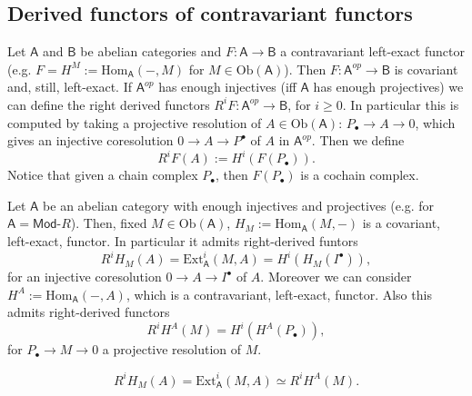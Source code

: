 \subsection{Derived functors of contravariant functors}
\begin{rem}
	Let $\mathsf{A}$ and $\mathsf{B}$ be abelian categories and $F: \mathsf{A} \to \mathsf{B}$
	a contravariant left-exact functor (e.g. $F = H^M := \mathrm{Hom}_{\mathsf{A}} \left( -, M \right)$
	for $M \in \mathrm{Ob} \left(\mathsf{A}\right)$).
	Then $F: \mathsf{A}^{op} \to \mathsf{B}$ is covariant and, still, left-exact.
	If $\mathsf{A}^{op}$ has enough injectives (iff $\mathsf{A}$ has enough projectives)
	we can define the right derived functors $R^iF: \mathsf{A}^{op} \to \mathsf{B}$, for $i \geq 0$.
	In particular this is computed by taking a projective resolution of $A \in \mathrm{Ob} \left(\mathsf{A}\right)$:
	$P_{\bullet} \to A \to 0$, which gives an injective coresolution
	$0 \to A \to P^\bullet$ of $A$ in $\mathsf{A}^{op}$.
	Then we define
	\begin{equation}
		R^iF(A) := H^i(F(P_\bullet))
	.\end{equation} 
	Notice that given a chain complex $P_{\bullet}$, then $F(P_{\bullet})$ is a 
	cochain complex.
\end{rem}

\begin{rem}[]
	Let $\mathsf{A}$ be an abelian category with enough injectives and projectives (e.g. for
	$\mathsf{A} = \mathsf{Mod}\text{-}R$).
	Then, fixed $M \in \mathrm{Ob} \left(\mathsf{A}\right)$, $H_M := \mathrm{Hom}_{\mathsf{A}} \left( M, - \right)$
	is a covariant, left-exact, functor.
	In particular it admits right-derived funtors
	\begin{equation}
		R^iH_M(A) = \mathrm{Ext}^i_{\mathsf{A}} \left( M, A \right) =
		H^i \left( H_M (I^\bullet) \right)
	,\end{equation} 
	for an injective coresolution $0 \to A \to I^\bullet$ of $A$.
	Moreover we can consider $H^A := \mathrm{Hom}_{\mathsf{A}} \left( -, A \right)$, which
	is a contravariant, left-exact, functor.
	Also this admits right-derived functors
	\begin{equation}
		R^iH^A(M) = H^i \left( H^A(P_{\bullet}) \right)
	,\end{equation} 
	for $P_{\bullet} \to M \to 0$ a projective resolution of $M$.
\end{rem}

\begin{thm}
	\begin{equation}
		R^i H_M(A) = \mathrm{Ext}^i_{\mathsf{A}}(M,A)\simeq R^i H^A (M)
	.\end{equation} 
\end{thm}

